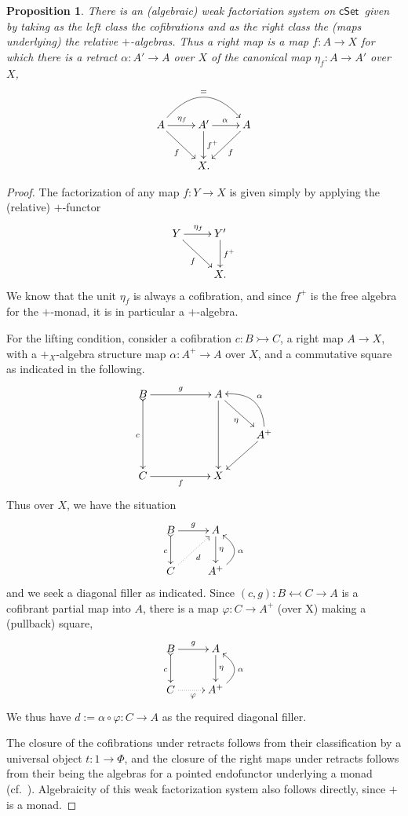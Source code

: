 \documentclass[11pt]{article}
\newcommand{\cSet}{\ensuremath{\mathsf{cSet}}}
\newcommand{\mono}{\ensuremath{\rightarrowtail}}
\newtheorem{proposition}[theorem]{Proposition}
\theoremstyle{remark}
\theoremstyle{definition}
\begin{document}
\begin{proposition}
There is an (algebraic) weak factoriation system on \cSet\ given by taking as the left class the cofibrations and as the right class the (maps underlying) the relative $+$-algebras. Thus a right map is a map $f :A\to X$ for which there is a retract $\alpha : A'\to A$ over $X$ of the canonical map $\eta_f : A\to A'$ over $X$,
\[
\xymatrix{
A\ar[rd]_{f} \ar[r]^{\eta_f} \ar@/^6ex/ [rr]^= & A' \ar[r]^{\alpha} \ar[d]^-{f^+} & \ar[ld]^{f} A \\
& X. &
}
\]
\end{proposition}
\begin{proof}
The factorization of any map $f : Y\to X$ is given simply by applying the (relative) $+$-functor
\[
\xymatrix{
Y\ar[rd]_{f} \ar[r]^{\eta_f} & Y' \ar[d]^-{f^+} \\
& X. 
}
\]
We know that the unit $\eta_f$ is always a cofibration, and since $f^+$ is the free algebra for the $+$-monad, it is in particular a $+$-algebra.

For the lifting condition, consider a cofibration $c : B\mono C$, a right map $A\to X$, with a $+_X$-algebra structure map $\alpha: A^+ \to A$ over $X$, and a commutative square as indicated in the following.
\[
\xymatrix{
B \ar@{>->}[dd]_{c} \ar[rr]^{g}  && A \ar[dd] \ar[rd]_{\eta} & \\
 &&& A^+ \ar@/_4ex/ [lu]_\alpha  \ar[ld] \\
C \ar[rr]_{f} && X &
}
\]
Thus over $X$, we have the situation
\[
\xymatrix{
B\ar@{>->}[d]_{c} \ar[r]^{g} & A \ar[d]^-{\eta} \\
C \ar@{.>}[ru]_{d} & A^+ \ar@/_4ex/ [u]_\alpha
}
\]
and we seek a diagonal filler as indicated.
Since $(c,g) : B \leftarrowtail C \to A$ is a cofibrant partial map into $A$, there is a map $\varphi : C \to A^+$ (over X) making a (pullback) square,
\[
\xymatrix{
B\ar@{>->}[d]_{c} \ar[r]^{g} & A \ar[d]^-{\eta} \\
C \ar@{.>}[r]_{\varphi} & A^+ \ar@/_4ex/ [u]_\alpha
}
\]
We thus have $d := \alpha\circ \varphi : C \to A$ as the required diagonal filler.

The closure of the cofibrations under retracts follows from their classification by a universal object $t : 1 \to \Phi$, and the closure of the right maps under retracts follows from their being the algebras for a pointed endofunctor underlying a monad (cf.~\cite{RV}).  Algebraicity of this weak factorization system also follows directly, since $+$ is a monad.
\end{proof}
\end{document}
